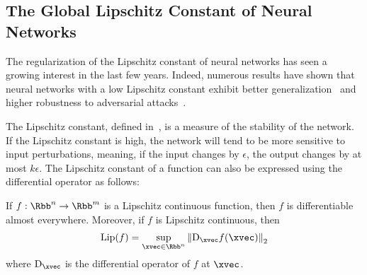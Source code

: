 
\subsection{The Global Lipschitz Constant of Neural Networks}
\label{subsection:ch3-the_global_lipschitz_constant_of_neural_networks}

\noindent
The regularization of the Lipschitz constant of neural networks has seen a growing interest in the last few years.
Indeed, numerous results have shown that neural networks with a low Lipschitz constant exhibit better generalization~\cite{bartlett2017spectrally} and higher robustness to adversarial attacks~\cite{szegedy2013intriguing,tsuzuku2018lipschitz, farnia2018generalizable}.

The Lipschitz constant, defined in~, is a measure of the stability of the network.
If the Lipschitz constant is high, the network will tend to be more sensitive to input perturbations, meaning, if the input changes by $\epsilon$, the output changes by at most $k\epsilon$.
The Lipschitz constant of a function can also be expressed using the differential operator as follows:
\begin{theorem} \label{theorem:ch3-lipschitz_differential_op}
  If $f: \Rbb^n \rightarrow \Rbb^m$ is a Lipschitz continuous function, then $f$ is differentiable almost everywhere.
  Moreover, if $f$ is Lipschitz continuous, then
  \begin{align}
    \lip{f} = \sup_{\xvec \in \Rbb^n} \norm{\mathrm{D}_\xvec f(\xvec)}_2
  \end{align}
  where $\mathrm{D}_\xvec$ is the differential operator of $f$ at $\xvec$.
\end{theorem}

